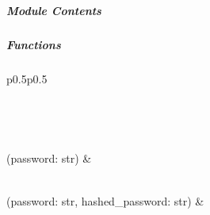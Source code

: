 \documentclass[letterpaper,10pt,english]{sphinxmanual}
\begin{document}
\subparagraph{Module Contents}
\label{\detokenize{autoapi/pine/backend/auth/password/index:module-contents}}

\subparagraph{Functions}
\label{\detokenize{autoapi/pine/backend/auth/password/index:functions}}

\begin{savenotes}\sphinxatlongtablestart\begin{longtable}[c]{p{0.5\linewidth}p{0.5\linewidth}}
\hline

\endfirsthead

%
{}\\
\hline

\endhead

\hline
{}\\
\endfoot

\endlastfoot

{\hyperref[\detokenize{autoapi/pine/backend/auth/password/index:pine.backend.auth.password.hash_password}]{}}(password: str)
&

\\
\hline
{\hyperref[\detokenize{autoapi/pine/backend/auth/password/index:pine.backend.auth.password.check_password}]{}}(password: str, hashed\_password: str)
&

\\
\hline
\end{longtable}\sphinxatlongtableend\end{savenotes}

\begin{fulllineitems}
\label{\detokenize{autoapi/pine/backend/auth/password/index:pine.backend.auth.password.hash_password}}
\end{fulllineitems}

\end{document}
